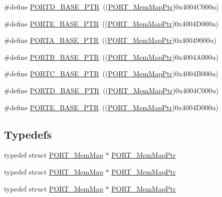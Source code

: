 \begin{DoxyCompactItemize}
\item 
\#define \hyperlink{group___p_o_r_t___peripheral_ga7f5a263751543810ebfdbde278383276}{P\+O\+R\+T\+D\+\_\+\+B\+A\+S\+E\+\_\+\+P\+TR}~((\hyperlink{group___p_o_r_t___peripheral_ga0e26bafb7c17808f90278627bcbcaf8c}{P\+O\+R\+T\+\_\+\+Mem\+Map\+Ptr})0x4004\+C000u)
\item 
\#define \hyperlink{group___p_o_r_t___peripheral_gab166fe285bbb15b52de610f408fe25d3}{P\+O\+R\+T\+E\+\_\+\+B\+A\+S\+E\+\_\+\+P\+TR}~((\hyperlink{group___p_o_r_t___peripheral_ga0e26bafb7c17808f90278627bcbcaf8c}{P\+O\+R\+T\+\_\+\+Mem\+Map\+Ptr})0x4004\+D000u)
\item 
\#define \hyperlink{group___p_o_r_t___peripheral_gaa18ec7594fe603225220ec6eda4a19ce}{P\+O\+R\+T\+A\+\_\+\+B\+A\+S\+E\+\_\+\+P\+TR}~((\hyperlink{group___p_o_r_t___peripheral_ga0e26bafb7c17808f90278627bcbcaf8c}{P\+O\+R\+T\+\_\+\+Mem\+Map\+Ptr})0x40049000u)
\item 
\#define \hyperlink{group___p_o_r_t___peripheral_ga585b4782d1ceb44492289af0019480f9}{P\+O\+R\+T\+B\+\_\+\+B\+A\+S\+E\+\_\+\+P\+TR}~((\hyperlink{group___p_o_r_t___peripheral_ga0e26bafb7c17808f90278627bcbcaf8c}{P\+O\+R\+T\+\_\+\+Mem\+Map\+Ptr})0x4004\+A000u)
\item 
\#define \hyperlink{group___p_o_r_t___peripheral_ga03c740cdda17711afafc932723871474}{P\+O\+R\+T\+C\+\_\+\+B\+A\+S\+E\+\_\+\+P\+TR}~((\hyperlink{group___p_o_r_t___peripheral_ga0e26bafb7c17808f90278627bcbcaf8c}{P\+O\+R\+T\+\_\+\+Mem\+Map\+Ptr})0x4004\+B000u)
\item 
\#define \hyperlink{group___p_o_r_t___peripheral_ga7f5a263751543810ebfdbde278383276}{P\+O\+R\+T\+D\+\_\+\+B\+A\+S\+E\+\_\+\+P\+TR}~((\hyperlink{group___p_o_r_t___peripheral_ga0e26bafb7c17808f90278627bcbcaf8c}{P\+O\+R\+T\+\_\+\+Mem\+Map\+Ptr})0x4004\+C000u)
\item 
\#define \hyperlink{group___p_o_r_t___peripheral_gab166fe285bbb15b52de610f408fe25d3}{P\+O\+R\+T\+E\+\_\+\+B\+A\+S\+E\+\_\+\+P\+TR}~((\hyperlink{group___p_o_r_t___peripheral_ga0e26bafb7c17808f90278627bcbcaf8c}{P\+O\+R\+T\+\_\+\+Mem\+Map\+Ptr})0x4004\+D000u)
\end{DoxyCompactItemize}
\subsection*{Typedefs}
\begin{DoxyCompactItemize}
\item 
typedef struct \hyperlink{struct_p_o_r_t___mem_map}{P\+O\+R\+T\+\_\+\+Mem\+Map} $\ast$ \hyperlink{group___p_o_r_t___peripheral_ga0e26bafb7c17808f90278627bcbcaf8c}{P\+O\+R\+T\+\_\+\+Mem\+Map\+Ptr}
\item 
typedef struct \hyperlink{struct_p_o_r_t___mem_map}{P\+O\+R\+T\+\_\+\+Mem\+Map} $\ast$ \hyperlink{group___p_o_r_t___peripheral_ga0e26bafb7c17808f90278627bcbcaf8c}{P\+O\+R\+T\+\_\+\+Mem\+Map\+Ptr}
\item 
typedef struct \hyperlink{struct_p_o_r_t___mem_map}{P\+O\+R\+T\+\_\+\+Mem\+Map} $\ast$ \hyperlink{group___p_o_r_t___peripheral_ga0e26bafb7c17808f90278627bcbcaf8c}{P\+O\+R\+T\+\_\+\+Mem\+Map\+Ptr}
\end{DoxyCompactItemize}


